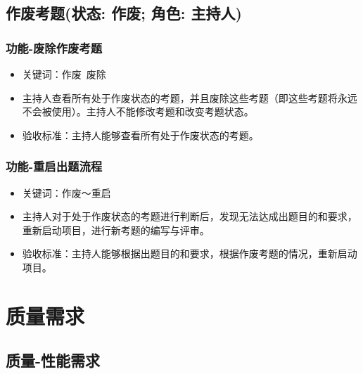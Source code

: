 \documentclass[hyperref, a4paper]{ctexart}
\begin{document}
\hypertarget{ux4f5cux5e9fux8003ux9898ux72b6ux6001-ux4f5cux5e9f-ux89d2ux8272-ux4e3bux6301ux4eba}{%
\subsection{作废考题(状态: 作废; 角色:
主持人)}\label{ux4f5cux5e9fux8003ux9898ux72b6ux6001-ux4f5cux5e9f-ux89d2ux8272-ux4e3bux6301ux4eba}}

\hypertarget{ux529fux80fd-ux5e9fux9664ux4f5cux5e9fux8003ux9898}{%
\subsubsection{功能-废除作废考题}\label{ux529fux80fd-ux5e9fux9664ux4f5cux5e9fux8003ux9898}}

\begin{itemize}
\item
  关键词：作废~废除
\item
  主持人查看所有处于作废状态的考题，并且废除这些考题（即这些考题将永远不会被使用）。主持人不能修改考题和改变考题状态。
\item
  验收标准：主持人能够查看所有处于作废状态的考题。
\end{itemize}

\hypertarget{ux529fux80fd-ux91cdux542fux51faux9898ux6d41ux7a0b}{%
\subsubsection{功能-重启出题流程}\label{ux529fux80fd-ux91cdux542fux51faux9898ux6d41ux7a0b}}

\begin{itemize}
\item
  关键词：作废～重启
\item
  主持人对于处于作废状态的考题进行判断后，发现无法达成出题目的和要求，重新启动项目，进行新考题的编写与评审。
\item
  验收标准：主持人能够根据出题目的和要求，根据作废考题的情况，重新启动项目。
\end{itemize}

\hypertarget{ux8d28ux91cfux9700ux6c42}{%
\section{质量需求}\label{ux8d28ux91cfux9700ux6c42}}

\hypertarget{ux8d28ux91cf-ux6027ux80fdux9700ux6c42}{%
\subsection{质量-性能需求}\label{ux8d28ux91cf-ux6027ux80fdux9700ux6c42}}
\end{document}
